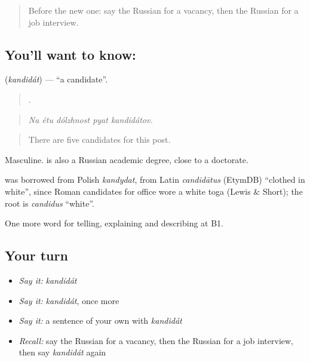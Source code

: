 \label{lesson:RU-C358-kandidat}



\begin{quote}
Before the new one: say the Russian for a vacancy, then the Russian for a job interview.
\end{quote}

\subsection*{You'll want to know: }
\textbf{} (\emph{kandidát}) — \textquotedblleft{}a candidate\textquotedblright{}.

\begin{quote}
    .
\end{quote}

\begin{quote}
\emph{Na étu dólzhnost pyat kandidátov.}
\end{quote}

\begin{quote}
There are five candidates for this post.
\end{quote}

Masculine. \emph{ } is also a Russian academic degree, close to a doctorate.

\begin{cousinweb}
\textbf{} was borrowed from Polish \emph{kandydat}, from Latin \emph{candidātus} (EtymDB) \textquotedblleft{}clothed in white\textquotedblright{}, since Roman candidates for office wore a white toga (Lewis \& Short); the root is \emph{candidus} \textquotedblleft{}white\textquotedblright{}.
\end{cousinweb}

\begin{grammarlens}[title={What you've built}]
One more word for telling, explaining and describing at B1.
\end{grammarlens}

\subsection*{Your turn}
\begin{itemize}
\raggedright
  \item \emph{Say it:} \emph{kandidát}
  \item \emph{Say it:} \emph{kandidát}, once more
  \item \emph{Say it:} a sentence of your own with \emph{kandidát}
  \item \emph{Recall:} say the Russian for a vacancy, then the Russian for a job interview, then say \emph{kandidát} again
\end{itemize}


